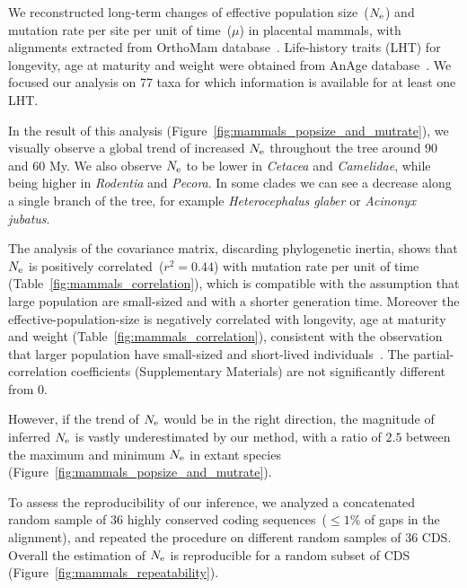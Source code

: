 We reconstructed long-term changes of effective population size~($N_{\mathrm{e}}$) and mutation rate per site per unit of time~($\mu$) in placental mammals, with alignments extracted from OrthoMam database~\citep{Ranwez2007,Scornavacca2019}.
Life-history traits (LHT) for longevity, age at maturity and weight were obtained from AnAge database~\citep{DEMAGALHAES2009,Tacutu2012}.
We focused our analysis on 77 taxa for which information is available for at least one LHT.

In the result of this analysis (Figure~\ref{fig:mammals_popsize_and_mutrate}), we visually observe a global trend of increased $N_{\mathrm{e}}$ throughout the tree around $90$ and $60$ My.
We also observe $N_{\mathrm{e}}$ to be lower in \textit{Cetacea} and \textit{Camelidae}, while being higher in \textit{Rodentia} and \textit{Pecora}.
In some clades we can see a decrease along a single branch of the tree, for example \textit{Heterocephalus glaber} or \textit{Acinonyx jubatus}.

The analysis of the covariance matrix, discarding phylogenetic inertia, shows that $N_{\mathrm{e}}$ is positively correlated~($r^2 = 0.44$) with mutation rate per unit of time (Table~\ref{fig:mammals_correlation}), which is compatible with the assumption that large population are small-sized and with a shorter generation time.
Moreover the \gls{effective-population-size} is negatively correlated with longevity, age at maturity and weight (Table~\ref{fig:mammals_correlation}), consistent with the observation that larger population have small-sized and short-lived individuals~\citep{Galtier2016,Romiguier2014}.
The partial-correlation coefficients (Supplementary Materials) are not significantly different from $0$.

However, if the trend of $N_{\mathrm{e}}$ would be in the right direction, the magnitude of inferred $N_{\mathrm{e}}$ is vastly underestimated by our method, with a ratio of $2.5$ between the maximum and minimum $N_{\mathrm{e}}$ in extant species (Figure~\ref{fig:mammals_popsize_and_mutrate}).

To assess the reproducibility of our inference, we analyzed a concatenated random sample of 36 highly conserved coding sequences~($\leq 1\%$ of gaps in the alignment), and repeated the procedure on different random samples of 36 CDS.
Overall the estimation of $N_{\mathrm{e}}$ is reproducible for a random subset of CDS (Figure~\ref{fig:mammals_repeatability}).

